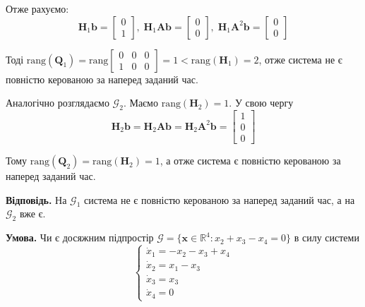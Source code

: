 \documentclass[oneside,solution]{karazin-control-assign}
\begin{document}
Отже рахуємо:
\begin{equation}
    \boldsymbol{H}_1\mathbf{b} = \begin{bmatrix}
        0 \\ 1
    \end{bmatrix}, \; \boldsymbol{H}_1\boldsymbol{A}\mathbf{b} = \begin{bmatrix}
        0 \\ 0
    \end{bmatrix}, \; \boldsymbol{H}_1\boldsymbol{A}^2\mathbf{b} = \begin{bmatrix}
        0 \\ 0
    \end{bmatrix}
\end{equation}

Тоді $\text{rang}(\boldsymbol{Q}_1) = \text{rang}\begin{bmatrix}
    0 & 0 & 0 \\ 1 & 0 & 0
\end{bmatrix} = 1 < \text{rang}(\boldsymbol{H}_1) = 2$, отже система не є повністю керованою за наперед заданий час.

Аналогічно розглядаємо $\mathcal{G}_2$. Маємо $\text{rang}(\boldsymbol{H}_2)=1$. У свою чергу
\begin{equation}
    \boldsymbol{H}_2\mathbf{b} = \boldsymbol{H}_2\boldsymbol{A}\mathbf{b} = \boldsymbol{H}_2\boldsymbol{A}^2\mathbf{b} =  \begin{bmatrix}
        1 \\ 0 \\ 0
    \end{bmatrix}
\end{equation}

Тому $\text{rang}(\boldsymbol{Q}_2) = \text{rang}(\boldsymbol{H}_2) = 1$, а отже система є повністю керованою за наперед заданий час.

\textbf{Відповідь.} На $\mathcal{G}_1$ система не є повністю керованою за наперед заданий час, а на $\mathcal{G}_2$ вже є.


\hspace{20px}\textbf{Умова.} Чи є досяжним підпростір $\mathcal{G} = \{\mathbf{x} \in \mathbb{R}^4: x_2+x_3-x_4=0\}$ в силу системи
\begin{equation}
    \begin{cases}
        \dot{x}_1 = -x_2-x_3+x_4 \\
        \dot{x}_2 = x_1 - x_3 \\
        \dot{x}_3 = x_3 \\
        \dot{x}_4 = 0
    \end{cases}
\end{equation}
\end{document}
